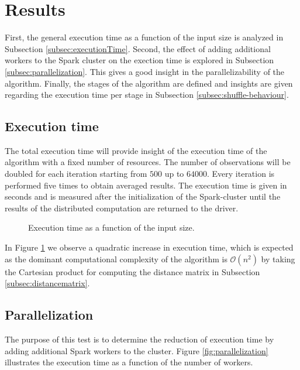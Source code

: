 \section{Results \label{sec:results}}

First, the general execution time as a function of the input size is analyzed in Subsection \ref{subsec:executionTime}. Second, the effect of adding additional workers to the Spark cluster on the exection time is explored in Subsection \ref{subsec:parallelization}. This gives a good insight in the parallelizability of the algorithm. Finally, the stages of the algorithm are defined and insights are given regarding the execution time per stage in Subsection \ref{subsec:shuffle-behaviour}.

\subsection{Execution time \label{subsec:executionTime}}

The total execution time will provide insight of the execution time of the algorithm with a fixed number of resources. The number of observations will be doubled for each iteration starting from $500$ up to $64000$. Every iteration is performed five times to obtain averaged results.
The execution time is given in seconds and is measured after the initialization of the Spark-cluster until the results of the distributed computation are returned to the driver.

\begin{figure}[ht!]
    \begin{center}
        
    \caption{Execution time as a function of the input size.}
    \label{fig:executiontime}
    \end{center}
\end{figure}

In Figure \ref{fig:executiontime} we observe a quadratic increase in execution time, which is expected as the dominant computational complexity of the algorithm is $\mathcal{O}(n^{2})$ by taking the Cartesian product for computing the distance matrix in Subsection \ref{subsec:distancematrix}.

\subsection{Parallelization \label{subsec:parallelization}}

The purpose of this test is to determine the reduction of execution time by adding additional Spark workers to the cluster. Figure \ref{fig:parallelization} illustrates the execution time as a function of the number of workers.

